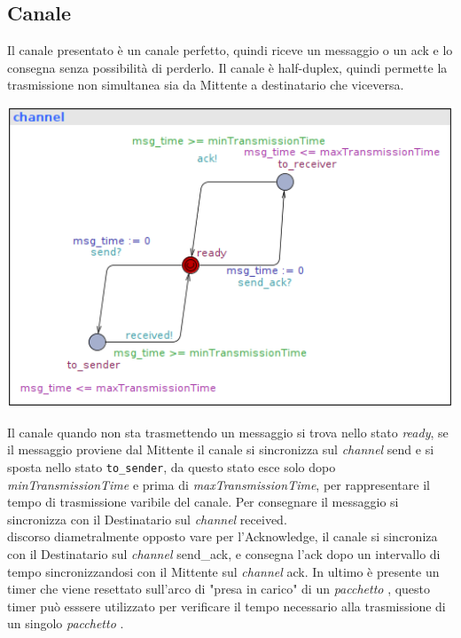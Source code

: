 \documentclass[a4paper]{article}
\newcommand{\channel}{\textit{channel }}
\newcommand{\pacchetto}{\textit{pacchetto }}
\begin{document}
\subsection{Canale}
Il canale presentato è un canale perfetto, quindi riceve un messaggio o un ack e lo consegna senza possibilità di perderlo.
Il canale è half-duplex, quindi permette la trasmissione non simultanea sia da Mittente a destinatario che viceversa.\\
\begin{center}\includegraphics[width=1\textwidth]{channel_safe.png}\end{center}
Il canale quando non sta trasmettendo un messaggio si trova nello stato \textit{ready}, se il messaggio proviene dal Mittente il canale si sincronizza sul \channel send e si sposta nello stato \texttt{to\_sender}, da questo stato esce solo dopo \textit{minTransmissionTime} e prima di \textit{maxTransmissionTime}, per rappresentare il tempo di trasmissione varibile del canale.
Per consegnare il messaggio si sincronizza con il Destinatario sul \channel received.\\
discorso diametralmente opposto vare per l'Acknowledge, il canale si sincroniza con il Destinatario sul \channel send\_ack, e consegna l'ack dopo un intervallo di tempo sincronizzandosi con il Mittente sul \channel ack.
In ultimo è presente un timer che viene resettato sull'arco di "presa in carico" di un \pacchetto, questo timer può esssere utilizzato per verificare il tempo necessario alla trasmissione di un singolo \pacchetto.
\end{document}
